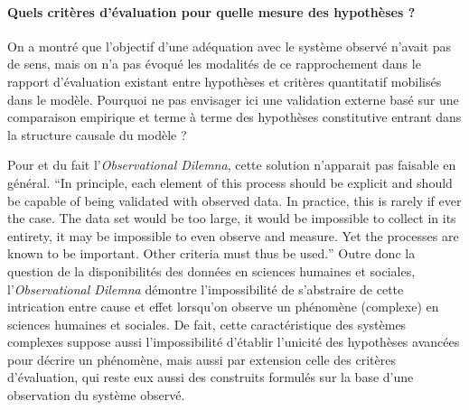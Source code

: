 



\paragraph{Quels critères d'évaluation pour quelle mesure des hypothèses ?}

On a montré que l'objectif d'une adéquation avec le système observé n'avait pas de sens, mais on n'a pas évoqué les modalités de ce rapprochement dans le rapport d'évaluation existant entre hypothèses et critères quantitatif mobilisés dans le modèle. Pourquoi ne pas envisager ici une validation externe basé sur une comparaison empirique et terme à terme des hypothèses constitutive entrant dans la structure causale du modèle  ?

Pour \textcite{Batty2001} et du fait l'\textit{Observational Dilemna}, cette solution n'apparait pas faisable en général. \foreignquote{english}{In principle, each element of this process should be explicit and should be capable of being validated with observed data. In practice, this is rarely if ever the case. The data set would be too large, it would be impossible to collect in its entirety, it may be impossible to even observe and measure. Yet the processes are known to be important. Other criteria must thus be used.} Outre donc la question de la disponibilités des données en sciences humaines et sociales, l'\textit{Observational Dilemna} démontre l'impossibilité de s'abstraire de cette intrication entre cause et effet lorsqu'on observe un phénomène (complexe) en sciences humaines et sociales. De fait, cette caractéristique des systèmes complexes suppose aussi l'impossibilité d'établir l'unicité des hypothèses avancées pour décrire un phénomène, mais aussi par extension celle des critères d'évaluation, qui reste eux aussi des construits formulés sur la base d'une observation du système observé.

